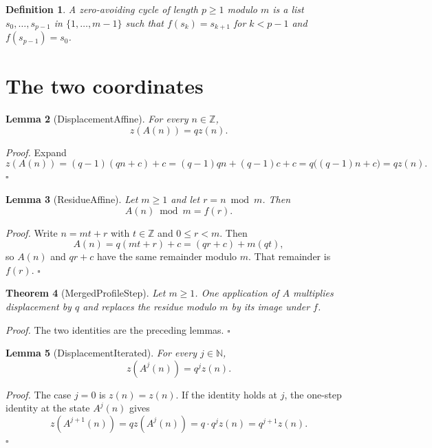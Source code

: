 \documentclass[11pt,letterpaper]{article}
\newcommand{\N}{\mathbb{N}}
\newcommand{\Z}{\mathbb{Z}}
\newtheorem{theorem}{Theorem}
\newtheorem{lemma}[theorem]{Lemma}
\newtheorem{definition}[theorem]{Definition}
\newenvironment{proof}{\noindent\textit{Proof.}}{\hfill\(\square\)}
\begin{document}
\begin{definition}
A zero-avoiding cycle of length \(p\ge 1\) modulo \(m\) is a list \(s_0,\ldots,s_{p-1}\) in \(\{1,\ldots,m-1\}\) such that \(f(s_k)=s_{k+1}\) for \(k<p-1\) and \(f(s_{p-1})=s_0\).
\end{definition}

\section{The two coordinates}

\begin{lemma}[DisplacementAffine]
For every \(n\in\Z\),
\[
  z(A(n))=qz(n).
\]
\end{lemma}

\begin{proof}
Expand
\[
  z(A(n))=(q-1)(qn+c)+c
  =(q-1)qn+(q-1)c+c
  =q\bigl((q-1)n+c\bigr)
  =qz(n).
\]
\end{proof}

\begin{lemma}[ResidueAffine]
Let \(m\ge 1\) and let \(r=n\bmod m\). Then
\[
  A(n)\bmod m=f(r).
\]
\end{lemma}

\begin{proof}
Write \(n=mt+r\) with \(t\in\Z\) and \(0\le r<m\). Then
\[
  A(n)=q(mt+r)+c=(qr+c)+m(qt),
\]
so \(A(n)\) and \(qr+c\) have the same remainder modulo \(m\). That remainder is \(f(r)\).
\end{proof}

\begin{theorem}[MergedProfileStep]
Let \(m\ge 1\). One application of \(A\) multiplies displacement by \(q\) and replaces the residue modulo \(m\) by its image under \(f\).
\end{theorem}

\begin{proof}
The two identities are the preceding lemmas.
\end{proof}

\begin{lemma}[DisplacementIterated]
For every \(j\in\N\),
\[
  z(A^{j}(n))=q^{j}z(n).
\]
\end{lemma}

\begin{proof}
The case \(j=0\) is \(z(n)=z(n)\). If the identity holds at \(j\), the one-step identity at the state \(A^{j}(n)\) gives
\[
  z(A^{j+1}(n))=qz(A^{j}(n))=q\cdot q^{j}z(n)=q^{j+1}z(n).
\]
\end{proof}
\end{document}
